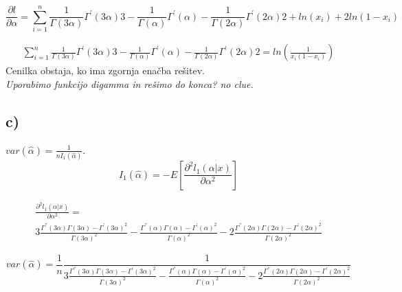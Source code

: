 \documentclass{article}
\begin{document}
\begin{equation*}
\frac{\partial l}{\partial \alpha} = \sum_{i = 1}^n \frac{1}{\Gamma(3\alpha)} \Gamma^{'}(3\alpha) 3 -
\frac{1}{\Gamma(\alpha)} \Gamma^{'}(\alpha) - \frac{1}{\Gamma(2\alpha)} \Gamma^{'}(2\alpha) 2 +
ln(x_i) + 2ln(1-x_i)
\end{equation*}

\begin{equation*}
\begin{split}
\sum_{i = 1}^n \frac{1}{\Gamma(3\alpha)} \Gamma^{'}(3\alpha) 3 -
\frac{1}{\Gamma(\alpha)} \Gamma^{'}(\alpha) - \frac{1}{\Gamma(2\alpha)} \Gamma^{'}(2\alpha) 2 =
ln(\frac{1}{x_i(1-x_i)})
\end{split}
\end{equation*}
Cenilka obstaja, ko ima zgornja enačba rešitev.\\
\textit{Uporabimo funkcijo digamma in rešimo do konca? no clue.}

\subsection*{c)}
$var(\hat{\alpha}) = \frac{1}{nI_1(\hat{\alpha})}$.
\begin{equation*}
I_1(\hat{\alpha}) = -E\left[  \frac{\partial^2l_1(\alpha|x)}{\partial \alpha^2}   \right]
\end{equation*}

\begin{equation*}
\begin{split}
\frac{\partial^2l_1(\alpha|x)}{\partial \alpha^2} =\\  3\frac{\Gamma^{''}(3\alpha)\Gamma(3\alpha) - \Gamma^{'}(3\alpha)^2}{\Gamma(3\alpha)^2} -
\frac{\Gamma^{''}(\alpha)\Gamma(\alpha) - \Gamma^{'}(\alpha)^2}{\Gamma(\alpha)^2} -
2\frac{\Gamma^{''}(2\alpha)\Gamma(2\alpha) - \Gamma^{'}(2\alpha)^2}{\Gamma(2\alpha)^2}
\end{split}
\end{equation*}

\begin{equation*}
var(\hat{\alpha}) =\frac{1}{n} \frac{1}{ 3\frac{\Gamma^{''}(3\alpha)\Gamma(3\alpha) - \Gamma^{'}(3\alpha)^2}{\Gamma(3\alpha)^2} -
\frac{\Gamma^{''}(\alpha)\Gamma(\alpha) - \Gamma^{'}(\alpha)^2}{\Gamma(\alpha)^2} -
2\frac{\Gamma^{''}(2\alpha)\Gamma(2\alpha) - \Gamma^{'}(2\alpha)^2}{\Gamma(2\alpha)^2}}
\end{equation*}
\end{document}
